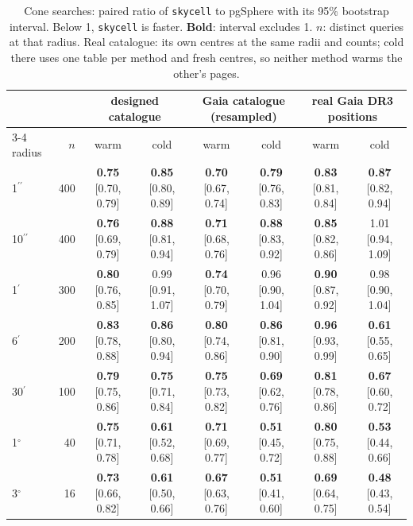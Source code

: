 \documentclass[final,5p,times,twocolumn,authoryear]{elsarticle}
\newcommand{\arcsec}{\ensuremath{^{\prime\prime}}}
\newcommand{\arcmin}{\ensuremath{^{\prime}}}
\newcommand{\degr}{\ensuremath{^{\circ}}}
\begin{document}
\begin{table}
  \caption{Cone searches: paired ratio of \texttt{skycell} to pgSphere with its 95\%
    bootstrap interval. Below 1, \texttt{skycell} is faster. \textbf{Bold}: interval
    excludes 1. $n$: distinct queries at that radius. Real catalogue: its own centres at
    the same radii and counts; cold there uses one table per method and fresh centres,
    so neither method warms the other's pages.}
  \label{tab:cones}
  \centering
  \footnotesize
  \setlength{\tabcolsep}{4pt}
  \begin{tabular}{l r cc cc cc}
    \hline\hline
    & & \multicolumn{2}{c}{designed catalogue} & \multicolumn{2}{c}{Gaia catalogue (resampled)} & \multicolumn{2}{c}{real Gaia DR3 positions} \\
    \cline{3-4}\cline{5-6}\cline{7-8}
    radius & $n$ & warm & cold & warm & cold & warm & cold \\
    \hline
    1\arcsec  & 400 & \textbf{0.75} [0.70, 0.79] & \textbf{0.85} [0.80, 0.89] & \textbf{0.70} [0.67, 0.74] & \textbf{0.79} [0.76, 0.83] & \textbf{0.83} [0.81, 0.84] & \textbf{0.87} [0.82, 0.94] \\
    10\arcsec & 400 & \textbf{0.76} [0.69, 0.79] & \textbf{0.88} [0.81, 0.94] & \textbf{0.71} [0.68, 0.76] & \textbf{0.88} [0.83, 0.92] & \textbf{0.85} [0.82, 0.86] & 1.01 [0.94, 1.09] \\
    1\arcmin  & 300 & \textbf{0.80} [0.76, 0.85] & 0.99 [0.91, 1.07] & \textbf{0.74} [0.70, 0.79] & 0.96 [0.90, 1.04] & \textbf{0.90} [0.87, 0.92] & 0.98 [0.90, 1.04] \\
    6\arcmin  & 200 & \textbf{0.83} [0.78, 0.88] & \textbf{0.86} [0.80, 0.94] & \textbf{0.80} [0.74, 0.86] & \textbf{0.86} [0.81, 0.90] & \textbf{0.96} [0.93, 0.99] & \textbf{0.61} [0.55, 0.65] \\
    30\arcmin & 100 & \textbf{0.79} [0.75, 0.86] & \textbf{0.75} [0.71, 0.84] & \textbf{0.75} [0.73, 0.82] & \textbf{0.69} [0.62, 0.76] & \textbf{0.81} [0.78, 0.86] & \textbf{0.67} [0.60, 0.72] \\
    1\degr    &  40 & \textbf{0.75} [0.71, 0.78] & \textbf{0.61} [0.52, 0.68] & \textbf{0.71} [0.69, 0.77] & \textbf{0.51} [0.45, 0.72] & \textbf{0.80} [0.75, 0.88] & \textbf{0.53} [0.44, 0.66] \\
    3\degr    &  16 & \textbf{0.73} [0.66, 0.82] & \textbf{0.61} [0.50, 0.66] & \textbf{0.67} [0.63, 0.76] & \textbf{0.51} [0.41, 0.60] & \textbf{0.69} [0.64, 0.75] & \textbf{0.48} [0.43, 0.54] \\
    \hline
  \end{tabular}
\end{table}
\end{document}
